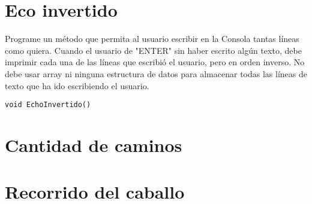 \section{Eco invertido}
Programe un método que permita al usuario escribir en la Consola tantas líneas como quiera. Cuando el usuario de "ENTER" sin haber escrito algún texto, debe imprimir cada una de las líneas que escribió el usuario, pero en orden inverso. No debe usar array ni ninguna estructura de datos para almacenar todas las líneas de texto que ha ido escribiendo el usuario.

\begin{verbatim}
void EchoInvertido()
\end{verbatim}
        
\section{Cantidad de caminos}


\section{Recorrido del caballo}
